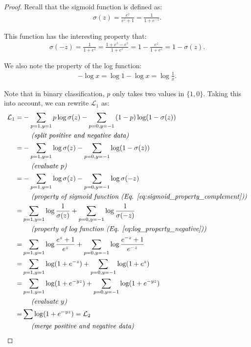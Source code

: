 \documentclass[sigconf,edbt]{acmart-edbt2019}
\begin{document}
\begin{proof}
Recall that the sigmoid function is defined as:
\begin{align}
	\sigma(z) = \frac{e^z}{e^z + 1} = \frac{1}{1 + e^{-z}}. \label{eq:sigmoid}
\end{align}

This function has the interesting property that:
\begin{align}
	\sigma(-z) = \frac{1}{1 + e^z} = \frac{1 + e^z - e^z}{1 + e^z} = 1 - \frac{e^z}{1 + e^z} = 1 - \sigma(z). \label{eq:sigmoid_property_complement}
\end{align}

We also note the property of the log function:
\begin{align}
	-\log x = \log 1 - \log x = \log \frac{1}{x}. \label{eq:log_property_negative}
\end{align}

Note that in binary classification, $p$ only takes two values in $\{1, 0\}$. Taking this into account, we can rewrite $\mathcal{L}_1$ as:
\begin{align}
	\mathcal{L}_1 = &- \sum_{p=1, y=1}{p \log \sigma(z)} - \sum_{p=0, y=-1}{(1-p) \log (1-\sigma(z))} \\
	&\ \ \ \ \textit{(split positive and negative data)} \nonumber \\
	= &- \sum_{p=1, y=1}{\log \sigma(z)} - \sum_{p=0, y=-1}{\log (1-\sigma(z))} \\
	&\ \ \ \ \textit{(evaluate $p$)} \nonumber \\
	= &- \sum_{p=1, y=1}{\log \sigma(z)} - \sum_{p=0, y=-1}{\log \sigma(-z)} \\
	&\ \ \ \ \textit{(property of sigmoid function (Eq. \ref{eq:sigmoid_property_complement}))} \nonumber \\
	= &\sum_{p=1, y=1}{\log \frac{1}{\sigma(z)}} + \sum_{p=0, y=-1}{\log \frac{1}{\sigma(-z)}} \\
	&\ \ \ \ \textit{(property of log function (Eq. \ref{eq:log_property_negative}))} \nonumber \\
	= &\sum_{p=1, y=1}{\log \frac{e^z + 1}{e^z}} + \sum_{p=0, y=-1}{\log \frac{e^{-z} + 1}{e^{-z}}} \\
	= &\sum_{p=1, y=1}{\log (1 + e^{-z})} + \sum_{p=0, y=-1}{\log (1 + e^{z})} \\
	= &\sum_{p=1, y=1}{\log (1 + e^{-yz})} + \sum_{p=0, y=-1}{\log (1 + e^{-yz})} \\
	&\ \ \ \ \textit{(evaluate $y$)} \nonumber \\
	= &\sum{\log (1 + e^{-yz})} = \mathcal{L}_2 \\
	&\ \ \ \ \textit{(merge positive and negative data)} \nonumber
\end{align}
\end{proof}
\end{document}
